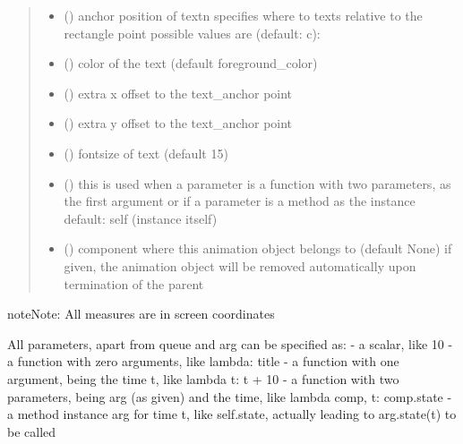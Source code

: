 \documentclass[letterpaper,10pt,english]{sphinxmanual}
\begin{document}
\begin{fulllineitems}
\begin{quote}
\begin{description}
\begin{itemize}
\item {} 
 () \textendash{} anchor position of text\textbar{}n\textbar{}
specifies where to texts relative to the rectangle
point 
possible values are (default: c): 

\item {} 
 () \textendash{} color of the text (default foreground\_color)

\item {} 
 () \textendash{} extra x offset to the text\_anchor point

\item {} 
 () \textendash{} extra y offset to the text\_anchor point

\item {} 
 () \textendash{} fontsize of text (default 15)

\item {} 
 () \textendash{} this is used when a parameter is a function with two parameters, as the first argument or
if a parameter is a method as the instance 
default: self (instance itself)

\item {} 
 ({\hyperref[\detokenize{Reference:salabim.Component}]{}}) \textendash{} component where this animation object belongs to (default None) 
if given, the animation object will be removed
automatically upon termination of the parent

\end{itemize}

\end{description}\end{quote}

\begin{sphinxadmonition}{note}{Note:}
All measures are in screen coordinates 

All parameters, apart from queue and arg can be specified as: 
- a scalar, like 10 
- a function with zero arguments, like lambda: title 
- a function with one argument, being the time t, like lambda t: t + 10 
- a function with two parameters, being arg (as given) and the time, like lambda comp, t: comp.state 
- a method instance arg for time t, like self.state, actually leading to arg.state(t) to be called
\end{sphinxadmonition}

\end{fulllineitems}
\end{document}
